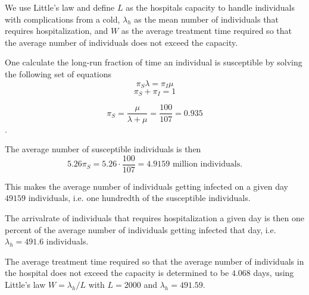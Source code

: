 We use Little's law and define $L$ as the hospitals capacity to handle individuals with complications from a cold, $\lambda_h$ as the mean number of individuals that requires hospitalization, and $W$ as the average treatment time required so that the average number of individuals does not exceed the capacity. 

One calculate the long-run fraction of time an individual is susceptible by solving the following set of equations
$$ \pi_S \lambda = \pi_I \mu$$ 
$$ \pi_S + \pi_I = 1 $$

$$ \pi_S = \frac{\mu}{\lambda + \mu} = \frac{100}{107} = 0.935$$.

The average number of susceptible individuals is then 
$$ 5.26  \pi_S = 5.26 \cdot \frac{100}{107} = 4.9159 \text{ million individuals.}$$

This makes the average number of individuals getting infected on a given day $ 49159$ individuals, i.e. one hundredth of the susceptible individuals.

The arrivalrate of individuals that requires hospitalization a given day is then one percent of the average number of individuals getting infected that day, i.e. $\lambda_h = 491.6$ individuals. 

The average treatment time required so that the average number of individuals in the hospital does not exceed the capacity is determined to be $4.068$ days, using Little's law $W = \lambda_h/L$ with $L = 2000$ and $\lambda_h = 491.59$. 



